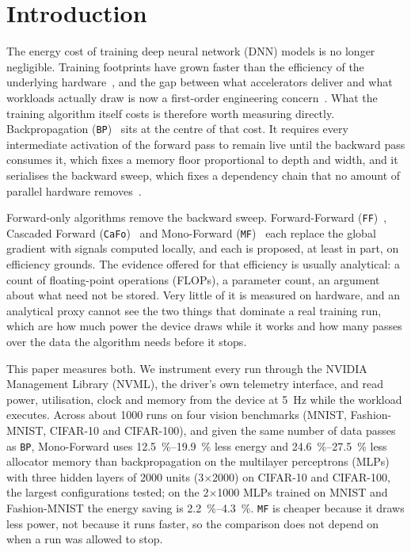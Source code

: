\documentclass{llncs}
\newcommand{\FF}{\texttt{FF}}
\newcommand{\MF}{\texttt{MF}}
\newcommand{\BP}{\texttt{BP}}
\newcommand{\CaFo}{\texttt{CaFo}}
\begin{document}
\section{Introduction}
\label{sec:intro}

The energy cost of training deep neural network (DNN) models is no longer negligible.
Training footprints have grown faster than the efficiency of the
underlying hardware~\cite{strubell2019energy,patterson2021carbon}, and
the gap between what accelerators deliver and what workloads actually draw
is now a first-order engineering concern~\cite{jouppi2017datacenter,wef2025paradox}.
What the training algorithm itself costs is therefore worth measuring directly.
Backpropagation (\BP{})~\cite{rumelhart1986learning} sits at the centre of that
cost. It requires every intermediate activation of the forward pass to remain
live until the backward pass consumes it, which fixes a memory floor
proportional to depth and width, and it serialises the backward sweep, which
fixes a dependency chain that no amount of parallel hardware
removes~\cite{jaderberg2017decoupled,lillicrap2020backpropagation}.

Forward-only algorithms remove the backward sweep. Forward-Forward
(\FF{})~\cite{hinton2022forward}, Cascaded Forward
(\CaFo{})~\cite{zhao2023cafo} and Mono-Forward
(\MF{})~\cite{gong2025mono} each replace the global gradient with signals
computed locally, and each is proposed, at least in part, on efficiency
grounds. The evidence offered for that efficiency is usually analytical: a
count of floating-point operations (FLOPs), a parameter count, an argument about what need not be stored. Very
little of it is measured on hardware, and an analytical proxy cannot see the
two things that dominate a real training run, which are how much power the
device draws while it works and how many passes over the data the algorithm
needs before it stops.

This paper measures both. We instrument every run through the NVIDIA
Management Library (NVML), the driver's own telemetry interface, and read
power, utilisation, clock and memory from the device at \SI{5}{\hertz} while
the workload executes. Across about \num{1000} runs on four vision benchmarks
(MNIST, Fashion-MNIST, CIFAR-10 and CIFAR-100), and given the same number of
data passes as \BP{}, Mono-Forward uses \SIrange{12.5}{19.9}{\percent} less energy and
\SIrange{24.6}{27.5}{\percent} less allocator memory than backpropagation on
the multilayer perceptrons (MLPs) with three hidden layers of \num{2000} units
(\num{3}$\times$\num{2000}) on CIFAR-10 and CIFAR-100, the largest
configurations tested; on the \num{2}$\times$\num{1000} MLPs trained on MNIST
and Fashion-MNIST the energy saving is \SIrange{2.2}{4.3}{\percent}. \MF{} is
cheaper because it draws less power, not because it runs faster, so the
comparison does not depend on when a run was allowed to stop.
\end{document}
